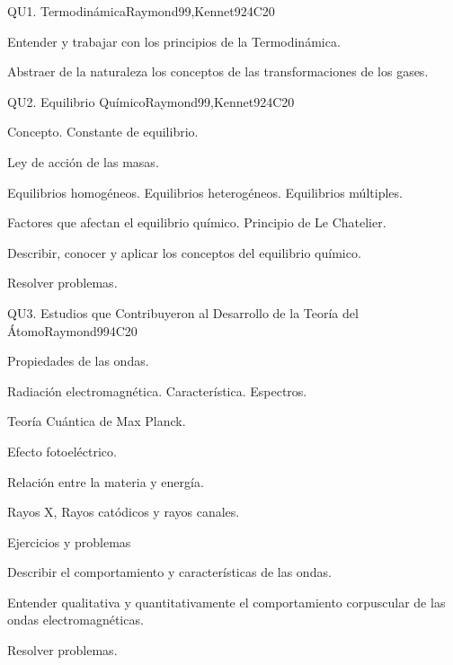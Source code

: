\begin{syllabus}
\begin{unit}{QU1. Termodinámica}{}{Raymond99,Kennet92}{4}{C20}
   \begin{learningoutcomes}
      \item Entender y trabajar con los principios de la Termodinámica.
      \item Abstraer de la naturaleza los conceptos de las transformaciones de los gases.
   \end{learningoutcomes}
\end{unit}

\begin{unit}{QU2. Equilibrio Químico}{}{Raymond99,Kennet92}{4}{C20}
\begin{topics}
      \item Concepto. Constante de equilibrio.
      \item Ley de acción de las masas.
      \item Equilibrios homogéneos. Equilibrios heterogéneos. Equilibrios múltiples.
      \item Factores que afectan el equilibrio químico. Principio de Le Chatelier.
    \end{topics}
   \begin{learningoutcomes}
      \item Describir, conocer y aplicar los conceptos del equilibrio químico.
      \item Resolver problemas.
   \end{learningoutcomes}
\end{unit}

\begin{unit}{QU3. Estudios que Contribuyeron al Desarrollo de la Teoría del Átomo}{}{Raymond99}{4}{C20}
\begin{topics}
      \item Propiedades de las ondas.
      \item Radiación electromagnética. Característica. Espectros.
      \item Teoría Cuántica de Max Planck.
      \item Efecto fotoeléctrico.
      \item Relación entre la materia y energía.
      \item Rayos X, Rayos catódicos y rayos canales.
      \item Ejercicios y problemas
\end{topics}

   \begin{learningoutcomes}
      \item Describir el comportamiento y características de las ondas.
      \item Entender qualitativa y quantitativamente el comportamiento corpuscular de las ondas electromagnéticas.
      \item Resolver problemas.
   \end{learningoutcomes}
\end{unit}


\end{syllabus}

